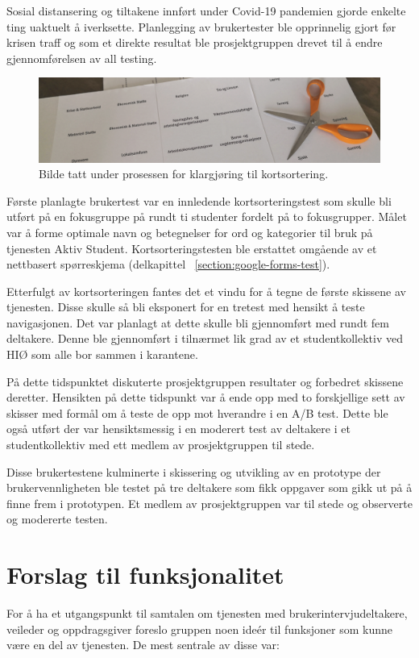 Sosial distansering og tiltakene innført under Covid-19 pandemien gjorde enkelte ting uaktuelt å iverksette. Planlegging av brukertester ble opprinnelig gjort før krisen traff og som et direkte resultat ble prosjektgruppen drevet til å endre gjennomførelsen av all testing.

\begin{figure}[H]
\centering
\includegraphics[width=1\textwidth]{Illustrasjoner/saks.png}
\caption{Bilde tatt under prosessen for klargjøring til kortsortering.}
\end{figure}

Første planlagte brukertest var en innledende kortsorteringstest som skulle bli utført på en fokusgruppe på rundt ti studenter fordelt på to fokusgrupper. Målet var å forme optimale navn og betegnelser for ord og kategorier til bruk på tjenesten Aktiv Student. Kortsorteringstesten ble erstattet omgående av et nettbasert spørreskjema (delkapittel ~\ref{section:google-forms-test}).

Etterfulgt av kortsorteringen fantes det et vindu for å tegne de første skissene av tjenesten. Disse skulle så bli eksponert for en tretest med hensikt å teste navigasjonen. Det var planlagt at dette skulle bli gjennomført med rundt fem deltakere. Denne ble gjennomført i tilnærmet lik grad av et studentkollektiv ved HIØ som alle bor sammen i karantene.

På dette tidspunktet diskuterte prosjektgruppen resultater og forbedret skissene deretter. Hensikten på dette tidspunkt var å ende opp med to forskjellige sett av skisser med formål om å teste de opp mot hverandre i en A/B test. Dette ble også utført der var hensiktsmessig i en moderert test av deltakere i et studentkollektiv med ett medlem av prosjektgruppen til stede.

Disse brukertestene kulminerte i skissering og utvikling av en prototype der brukervennligheten ble testet på tre deltakere som fikk oppgaver som gikk ut på å finne frem i prototypen. Et medlem av prosjektgruppen var til stede og observerte og modererte testen.





\section{Forslag til funksjonalitet}
\label{section:funkForslag}
For å ha et utgangspunkt til samtalen om tjenesten med brukerintervjudeltakere, veileder og oppdragsgiver foreslo gruppen noen ideér til funksjoner som kunne være en del av tjenesten. De mest sentrale av disse var:

